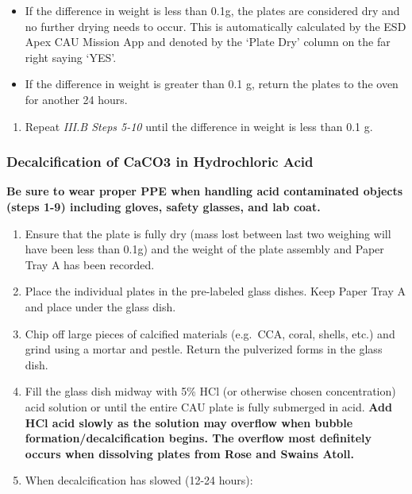 \documentclass[]{book}
\providecommand{\tightlist}{%
  \setlength{\itemsep}{0pt}\setlength{\parskip}{0pt}}
\begin{document}
\begin{itemize}
\item
  If the difference in weight is less than 0.1g, the plates are considered dry and no further drying needs to occur. This is automatically calculated by the ESD Apex CAU Mission App and denoted by the `Plate Dry' column on the far right saying `YES'.
\item
  If the difference in weight is greater than 0.1 g, return the plates to the oven for another 24 hours.
\end{itemize}

\begin{enumerate}
\def\labelenumi{\arabic{enumi}.}
\setcounter{enumi}{10}
\tightlist
\item
  Repeat \emph{III.B Steps 5-10} until the difference in weight is less than 0.1 g.
\end{enumerate}

\hypertarget{decalcification-of-caco3-in-hydrochloric-acid}{%
\subsubsection{Decalcification of CaCO3 in Hydrochloric Acid}\label{decalcification-of-caco3-in-hydrochloric-acid}}

\textbf{Be sure to wear proper PPE when handling acid contaminated objects (steps 1-9) including gloves, safety glasses, and lab coat.}

\begin{enumerate}
\def\labelenumi{\arabic{enumi}.}
\item
  Ensure that the plate is fully dry (mass lost between last two weighing will have been less than 0.1g) and the weight of the plate assembly and Paper Tray A has been recorded.
\item
  Place the individual plates in the pre-labeled glass dishes. Keep Paper Tray A and place under the glass dish.
\item
  Chip off large pieces of calcified materials (e.g.~CCA, coral, shells, etc.) and grind using a mortar and pestle. Return the pulverized forms in the glass dish.
\item
  Fill the glass dish midway with 5\% HCl (or otherwise chosen concentration) acid solution or until the entire CAU plate is fully submerged in acid. \textbf{Add HCl acid slowly as the solution may overflow when bubble formation/decalcification begins. The overflow most definitely occurs when dissolving plates from Rose and Swains Atoll.}
\item
  When decalcification has slowed (12-24 hours):
\end{enumerate}
\end{document}
